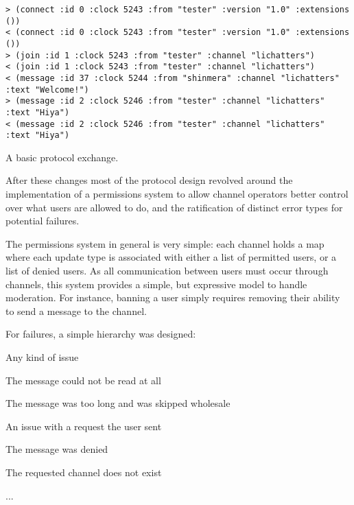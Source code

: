 \documentclass[format=sigconf]{acmart}
\begin{document}
\begin{listing}[h]
\begin{verbatim}
> (connect :id 0 :clock 5243 :from "tester" :version "1.0" :extensions ())
< (connect :id 0 :clock 5243 :from "tester" :version "1.0" :extensions ())
> (join :id 1 :clock 5243 :from "tester" :channel "lichatters")
< (join :id 1 :clock 5243 :from "tester" :channel "lichatters")
< (message :id 37 :clock 5244 :from "shinmera" :channel "lichatters" :text "Welcome!")
> (message :id 2 :clock 5246 :from "tester" :channel "lichatters" :text "Hiya")
< (message :id 2 :clock 5246 :from "tester" :channel "lichatters" :text "Hiya")
\end{verbatim}
\caption{A basic protocol exchange.}
\label{lst:basic-exchange}
\end{listing}

After these changes most of the protocol design revolved around the implementation of a permissions system to allow channel operators better control over what users are allowed to do, and the ratification of distinct error types for potential failures.

The permissions system in general is very simple: each channel holds a map where each update type is associated with either a list of permitted users, or a list of denied users. As all communication between users must occur through channels, this system provides a simple, but expressive model to handle moderation. For instance, banning a user simply requires removing their ability to send a  message to the channel.

For failures, a simple hierarchy was designed:

\begin{step}
\item {} Any kind of issue
  \begin{step}
  \item {} The message could not be read at all
  \item {} The message was too long and was skipped wholesale
  \item {} An issue with a request the user sent
    \begin{step}
    \item {} The message was denied
    \item {} The requested channel does not exist
    \item ...
    \end{step}
  \end{step}
\end{step}
\end{document}
